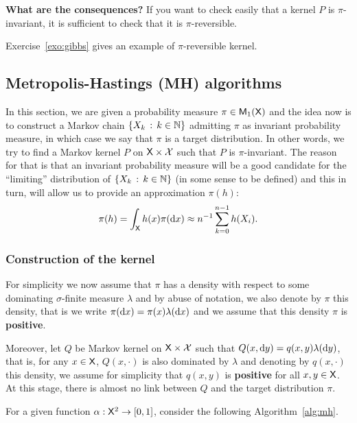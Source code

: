\documentclass[english,graybox,envcountchap,envcountsame,sectrefs,shortlabels]{svmono}
\theoremstyle{style}
\begin{document}
\begin{leftbar}

\textbf{What are the consequences?} If you want to check easily that
a kernel $P$ is $\pi$-invariant, it is sufficient to check that
it is $\pi$-reversible.

\end{leftbar}

Exercise~\ref{exo:gibbs} gives an example of $\pi$-reversible kernel.

\subsection{Metropolis-Hastings (MH) algorithms}
\label{sec:MH}
In this section, we are given a probability measure $\pi\in\mathsf{M}_{1}(\mathsf{X})$
and the idea now is to construct a Markov chain $\left\{ X_{k}\,:\,k\in\mathbb{N}\right\}$
admitting $\pi$ as invariant probability measure, in which case we
say that $\pi$ is a target distribution. In other words, we try to
find a Markov kernel $P$ on $\mathsf{X}\times\mathcal{X}$ such that $P$
is $\pi$-invariant. The reason for that is that an invariant probability
measure will be a good candidate for the ``limiting'' distribution
of $\left\{ X_{k}\,:\,k\in\mathbb{N}\right\}$ (in some sense to be defined) and this
in turn, will allow us to provide an approximation $\pi(h)$:
\[
\pi(h)=\int_{\mathsf{X}}h(x)\pi(\mathrm{d} x)\approx n^{-1}\sum_{k=0}^{n-1}h(X_{i}).
\]


\subsubsection{Construction of the kernel\label{subsec:construc}}

For simplicity we now assume that $\pi$ has a density with respect
to some dominating $\sigma$-finite measure $\lambda$ and by abuse
of notation, we also denote by $\pi$ this density, that is we write
$\pi(\mathrm{d} x)=\pi(x)\lambda(\mathrm{d} x)$ and we assume that this density
$\pi$ is \textbf{positive}.

Moreover, let $Q$ be Markov kernel on $\mathsf{X}\times\mathcal{X}$ such
that $Q(x,\mathrm{d} y)=q(x,y)\lambda(\mathrm{d} y)$, that is, for any $x\in\mathsf{X}$,
$Q(x,\cdot)$ is also dominated by $\lambda$ and denoting by $q(x,\cdot)$
this density, we assume for simplicity that $q(x,y)$ is \textbf{positive}
for all $x,y\in\mathsf{X}$. At this stage, there is almost no link between
$Q$ and the target distribution $\pi$.

For a given function $\alpha:\mathsf{X}^{2}\to[0,1]$, consider the following Algorithm~\ref{alg:mh}.
\end{document}
